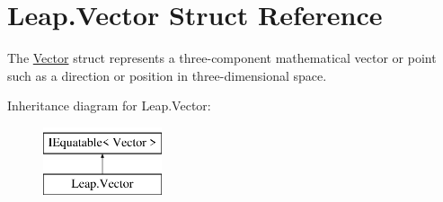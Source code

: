 \hypertarget{struct_leap_1_1_vector}{}\section{Leap.\+Vector Struct Reference}
\label{struct_leap_1_1_vector}


The \mbox{\hyperlink{struct_leap_1_1_vector}{Vector}} struct represents a three-\/component mathematical vector or point such as a direction or position in three-\/dimensional space.  


Inheritance diagram for Leap.\+Vector\+:\begin{figure}[H]
\begin{center}
\leavevmode
\includegraphics[height=2.000000cm]{struct_leap_1_1_vector}
\end{center}
\end{figure}

